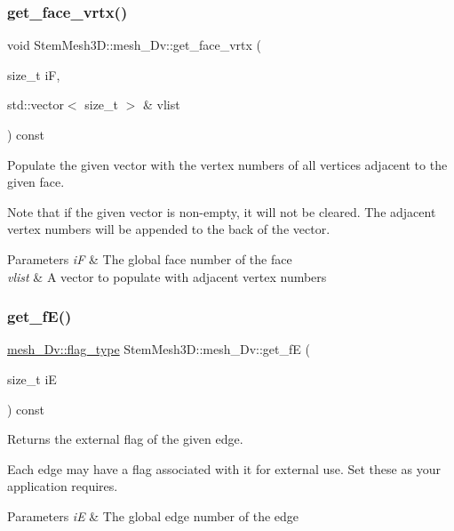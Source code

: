 \subsubsection{\texorpdfstring{get\+\_\+face\+\_\+vrtx()}{get\_face\_vrtx()}}
{\footnotesize\ttfamily void Stem\+Mesh3\+D\+::mesh\+\_\+Dv\+::get\+\_\+face\+\_\+vrtx (\begin{DoxyParamCaption}\item[{size\+\_\+t}]{iF,  }\item[{std\+::vector$<$ size\+\_\+t $>$ \&}]{vlist }\end{DoxyParamCaption}) const}



Populate the given vector with the vertex numbers of all vertices adjacent to the given face. 

Note that if the given vector is non-\/empty, it will not be cleared. The adjacent vertex numbers will be appended to the back of the vector. 
\begin{DoxyParams}{Parameters}
{\em iF} & The global face number of the face \\
\hline
{\em vlist} & A vector to populate with adjacent vertex numbers \\
\hline
\end{DoxyParams}
\mbox{\label{classStemMesh3D_1_1mesh__3Dv_af9f9b082c0849c0d4b2f52f20a5f491a}} 
\subsubsection{\texorpdfstring{get\+\_\+f\+E()}{get\_fE()}}
{\footnotesize\ttfamily \hyperlink{classStemMesh3D_1_1mesh__3Dv_a9544cba555b60f17f04fcd1689314338}{mesh\+\_\+Dv\+::flag\+\_\+type} Stem\+Mesh3\+D\+::mesh\+\_\+Dv\+::get\+\_\+fE (\begin{DoxyParamCaption}\item[{size\+\_\+t}]{iE }\end{DoxyParamCaption}) const}



Returns the external flag of the given edge. 

Each edge may have a flag associated with it for external use. Set these as your application requires. 
\begin{DoxyParams}{Parameters}
{\em iE} & The global edge number of the edge \\
\hline
\end{DoxyParams}
\mbox{\label{classStemMesh3D_1_1mesh__3Dv_a18b520ee0f337abad9f7f1c07ddb423d}} 
